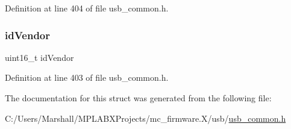 Definition at line 404 of file usb\+\_\+common.\+h.

\mbox{\label{struct__override__client__driver__data_ab393e07556e3858fed36ed2e260d4b4c}} 
\subsubsection{\texorpdfstring{idVendor}{idVendor}}
{\footnotesize\ttfamily uint16\+\_\+t id\+Vendor}



Definition at line 403 of file usb\+\_\+common.\+h.



The documentation for this struct was generated from the following file\+:\begin{DoxyCompactItemize}
\item 
C\+:/\+Users/\+Marshall/\+M\+P\+L\+A\+B\+X\+Projects/mc\+\_\+firmware.\+X/usb/\mbox{\hyperlink{usb__common_8h}{usb\+\_\+common.\+h}}\end{DoxyCompactItemize}

